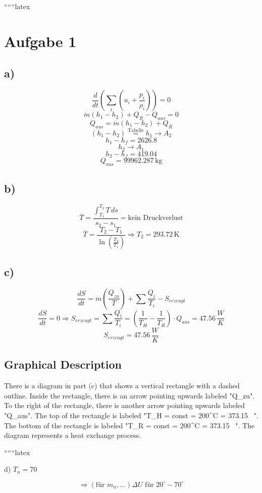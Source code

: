 
``````latex


\section*{Aufgabe 1}

\subsection*{a)}
\[
\frac{d}{dt} \left( \sum_i (u_i + \frac{p_i}{\rho_i}) \right) = 0
\]
\[
\dot{m}(h_1 - h_2) + Q_R - Q_{aus} = 0
\]
\[
Q_{aus} = \dot{m}(h_1 - h_2) + Q_R
\]
\[
(h_1 - h_2) \stackrel{\text{Tabelle}}{=} h_1 \rightarrow A_2
\]
\[
h_1 - h_f = 2626.8
\]
\[
h_2 \rightarrow A_1
\]
\[
h_2 - h_f = 419.04
\]
\[
Q_{aus} = 99962.287 \, \text{kg}
\]

\subsection*{b)}
\[
\bar{T} = \frac{\int_{T_1}^{T_2} T \, ds}{s_2 - s_1} = \text{kein Druckverlust}
\]
\[
\bar{T} = \frac{T_2 - T_1}{\ln \left( \frac{T_2}{T_1} \right)} \Rightarrow T_2 = 293.72 \, \text{K}
\]

\subsection*{c)}
\[
\frac{dS}{dt} = \dot{m} \left( \frac{Q_{zu}}{T} \right) + \sum \frac{Q_i}{T_i} - S_{erzeugt}
\]
\[
\frac{dS}{dt} = 0 \Rightarrow S_{erzeugt} = \sum \frac{Q_i}{T_i} = \left( \frac{1}{T_H} - \frac{1}{T_R} \right) \cdot Q_{aus} = 47.56 \, \frac{W}{K}
\]
\[
S_{erzeugt} = 47.56 \, \frac{W}{K}
\]

\subsection*{Graphical Description}
There is a diagram in part (c) that shows a vertical rectangle with a dashed outline. Inside the rectangle, there is an arrow pointing upwards labeled "Q_{zu}". To the right of the rectangle, there is another arrow pointing upwards labeled "Q_{aus}". The top of the rectangle is labeled "T_H = const = 200^\circ C = 373.15 \, ". The bottom of the rectangle is labeled "T_R = const = 200^\circ C = 373.15 \, ". The diagram represents a heat exchange process.

``````latex


d) \( T_{n} = 70 \)

\[
\Rightarrow \left( \text{für } m_{n}, \ldots \right) \Delta U \text{ für } 20^\circ - 70^\circ
\]

